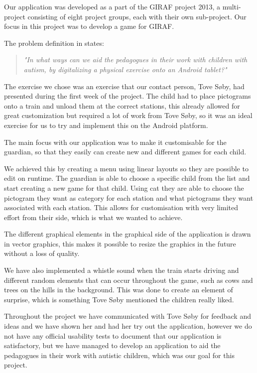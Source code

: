 Our application was developed as a part of the GIRAF project 2013, a multi-project consisting of eight project groups, each with their own sub-project. Our focus in this project was to develop a game for GIRAF. 

The problem definition in  states:

\begin{quote}
\textit{"In what ways can we aid the pedagogues in their work with children with autism, by digitalizing a physical exercise onto an Android tablet?"} 
\end{quote}
The exercise we chose was an exercise that our contact person, Tove Søby, had presented during the first week of the project. The child had to place pictograms onto a train and unload them at the correct stations, this already allowed for great customization but required a lot of work from Tove Søby, so it was an ideal exercise for us to try and implement this on the Android platform. 

The main focus with our application was to make it customisable for the guardian, so that they easily can create new and different games for each child. 

We achieved this by creating a menu using linear layouts so they are possible to edit on runtime. The guardian is able to choose a specific child from the list and start creating a new game for that child. Using \ac{cat} they are able to choose the pictogram they want as category for each station and what pictograms they want associated with each station. This allows for customisation with very limited effort from their side, which is what we wanted to achieve. 

The different graphical elements in the graphical side of the application is drawn in vector graphics, this makes it possible to resize the graphics in the future without a loss of quality. 

We have also implemented a whistle sound when the train starts driving and different random elements that can occur throughout the game, such as cows and trees on the hills in the background. This was done to create an element of surprise, which is something Tove Søby mentioned the children really liked. 

Throughout the project we have communicated with Tove Søby for feedback and ideas and we have shown her and had her try out the application, however we do not have any official usability tests to document that our application is satisfactory, but we have managed to develop an application to aid the pedagogues in their work with autistic children, which was our goal for this project. 
